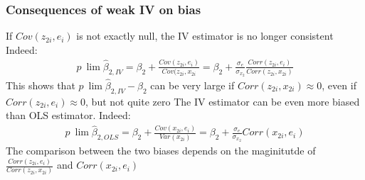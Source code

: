 \documentclass[a4paper,twoside,11pt]{article}
\begin{document}
\subsubsection{Consequences of weak IV on bias}
If $Cov(z_{2i},e_i)$ is not exactly null, the IV estimator is no longer consistent
\newline
\newline
Indeed:
\begin{equation*}
\begin{aligned}
p \ \lim \hat{\beta}_{2,IV} = \beta_2 + \frac{Cov(z_{2i},e_i)}{Cov(z_{2i},x_{2i}} = \beta_2 + \frac{\sigma_e}{\sigma_{x_2}} \frac{Corr(z_{2i},e_i)}{Corr(z_{2i},x_{2i})}
\end{aligned} 
\end{equation*}
This shows that $p \ \lim \hat{\beta}_{2,IV} - \beta_2$ can be very large if $Corr(z_{2i}, x_{2i}) \approx 0$, even if $Corr(z_{2i},e_i) \approx 0$, but not quite zero
\newline
\newline
The IV estimator can be even more biased than OLS estimator. Indeed:
\begin{equation*}
\begin{aligned}
p \ \lim \hat{\beta}_{2,OLS} = \beta_2 + \frac{Cov(x_{2i},e_i)}{Var(x_{2i})} = \beta_2 + \frac{\sigma_e}{\sigma_{x_2}} Corr(x_{2i},e_i)
\end{aligned} 
\end{equation*}
The comparison between the two biases depends on the maginitutde of $\frac{Corr(z_{2i},e_i)}{Corr(z_{2i},x_{2i})}$ and $Corr(x_{2i},e_i)$
\end{document}
